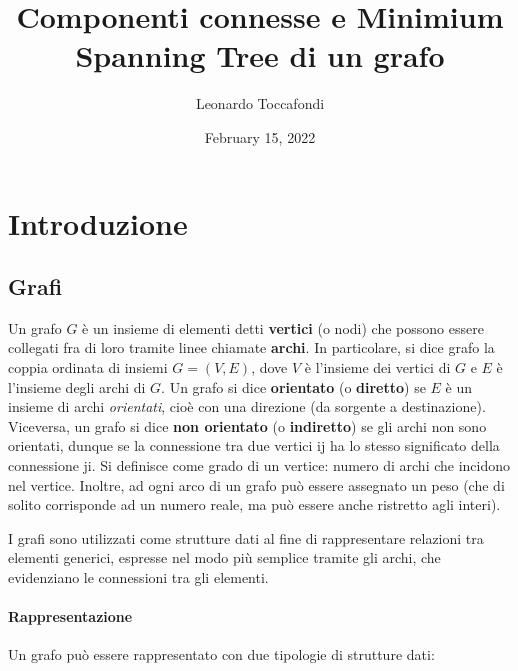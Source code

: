 \documentclass[
]{article}
\title{Componenti connesse e Minimium Spanning Tree di un grafo}
\author{Leonardo Toccafondi}
\date{February 15, 2022}
\begin{document}
\maketitle

\hypertarget{introduzione}{%
\section{Introduzione}\label{introduzione}}

\hypertarget{grafi}{%
\subsection{Grafi}\label{grafi}}

Un grafo \(G\) è un insieme di elementi detti \textbf{vertici} (o nodi)
che possono essere collegati fra di loro tramite linee chiamate
\textbf{archi}. In particolare, si dice grafo la coppia ordinata di
insiemi \(G = (V, E)\), dove \(V\) è l'insieme dei vertici di \(G\) e
\(E\) è l'insieme degli archi di \(G\). Un grafo si dice
\textbf{orientato} (o \textbf{diretto}) se \(E\) è un insieme di archi
\emph{orientati}, cioè con una direzione (da sorgente a destinazione).
Viceversa, un grafo si dice \textbf{non orientato} (o
\textbf{indiretto}) se gli archi non sono orientati, dunque se la
connessione tra due vertici ij ha lo stesso significato della
connessione ji. Si definisce come grado di un vertice: numero di archi
che incidono nel vertice. Inoltre, ad ogni arco di un grafo può essere
assegnato un peso (che di solito corrisponde ad un numero reale, ma può
essere anche ristretto agli interi).

I grafi sono utilizzati come strutture dati al fine di rappresentare
relazioni tra elementi generici, espresse nel modo più semplice tramite
gli archi, che evidenziano le connessioni tra gli elementi.

\hypertarget{rappresentazione}{%
\paragraph{Rappresentazione}\label{rappresentazione}}

Un grafo può essere rappresentato con due tipologie di strutture dati:
\end{document}
